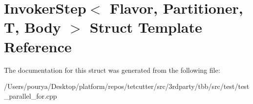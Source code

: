 \hypertarget{structInvokerStep}{}\section{Invoker\+Step$<$ Flavor, Partitioner, T, Body $>$ Struct Template Reference}
\label{structInvokerStep}


The documentation for this struct was generated from the following file\+:\begin{DoxyCompactItemize}
\item 
/\+Users/pourya/\+Desktop/platform/repos/tetcutter/src/3rdparty/tbb/src/test/test\+\_\+parallel\+\_\+for.\+cpp\end{DoxyCompactItemize}
